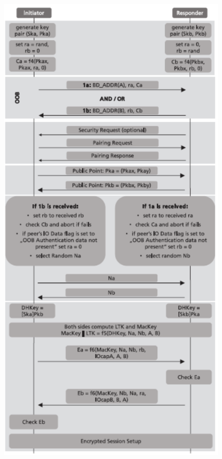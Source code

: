 \documentclass{Configuration_Files/PoliMi3i_thesis}
\begin{document}
\begin{figure}[H]
    \centering
    \includegraphics[scale=0.7]{Bluetooth_Security/8.png}
    \label{fig:pairing_procedure}
\end{figure}
\end{document}
